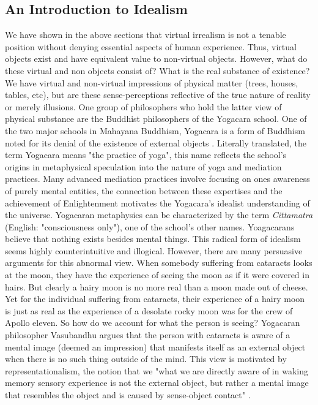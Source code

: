\subsection{An Introduction to Idealism}
We have shown in the above sections that virtual irrealism is not a tenable position without denying essential aspects of human experience. Thus, virtual objects exist and have equivalent value to non-virtual objects. However, what do these virtual and non objects consist of? What is the real substance of existence?  We have virtual and non-virtual impressions of physical matter (trees, houses, tables, etc), but are these sense-perceptions reflective of the true nature of reality or merely illusions. One group of philosophers who hold the latter view of physical substance are the Buddhist philosophers of the Yogacara school.  
\newline 
One of the two major schools in Mahayana Buddhism, Yogacara is a form of Buddhism noted for its denial of the existence of external objects \cite{siderits2007buddhism} . Literally translated, the term Yogacara means "the practice of yoga", this name reflects the school's origins in metaphysical speculation into the nature of yoga and mediation practices. Many advanced mediation practices involve focusing on ones awareness of purely mental entities, the connection between these expertises and the achievement of Enlightenment motivates the Yogacara's idealist understanding of the universe. Yogacaran metaphysics can be characterized by the term \textit{Cittamatra} (English: "consciousness only"), one of the school's other names. Yoagacarans believe that nothing exists besides mental things. This radical form of idealism seems highly counterintuitive and illogical. However, there are many persuasive arguments for this abnormal view. When somebody suffering from cataracts looks at the moon, they have the experience of seeing the moon as if it were covered in hairs. But clearly a hairy moon is no more real than a moon made out of cheese. Yet for the individual suffering from cataracts, their experience of a hairy moon is just as real as the experience of a desolate rocky moon was for the crew of Apollo eleven. So how do we account for what the person is seeing? Yogacaran philosopher Vasubandhu argues that the person with cataracts is aware of a mental image (deemed an impression) that manifests itself as an external object when there is no such thing outside of the mind. This view is motivated by representationalism, the notion that we "what we are directly aware of in waking memory sensory experience is not the external object, but rather a mental image that resembles the object and is caused by sense-object contact" \cite{siderits2007buddhism}.  \newline  
 
